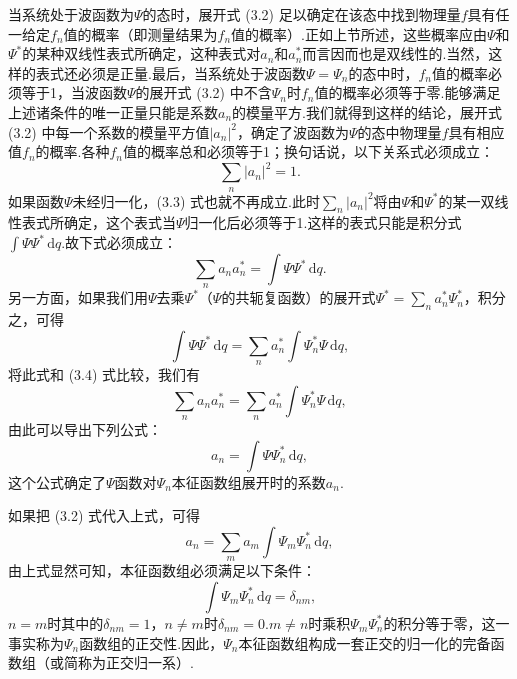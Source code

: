 当系统处于波函数为$\varPsi$的态时，展开式 (3.2) 足以确定在该态中找到物理量$f$具有任一给定$f_n$值的概率（即测量结果为$f_n$值的概率）.正如上节所述，这些概率应由$\varPsi$和$\varPsi^{*}$的某种双线性表式所确定，这种表式对$a_n$和$a_n^{*}$而言因而也是双线性的.当然，这样的表式还必须是正量.最后，当系统处于波函数$\varPsi=\varPsi_n$的态中时，$f_n$值的概率必须等于1，当波函数$\varPsi$的展开式 (3.2) 中不含$\varPsi_n$时$f_n$值的概率必须等于零.能够满足上述诸条件的唯一正量只能是系数$a_n$的模量平方.我们就得到这样的结论，展开式 (3.2) 中每一个系数的模量平方值$|a_n|^2$，确定了波函数为$\varPsi$的态中物理量$f$具有相应值$f_n$的概率.各种$f_n$值的概率总和必须等于1；换句话说，以下关系式必须成立：
\begin{equation}
  \sum_n|a_n|^2=1.
\end{equation}
如果函数$\varPsi$未经归一化，(3.3) 式也就不再成立.此时$\sum_n|a_n|^2$将由$\varPsi$和$\varPsi^{*}$的某一双线性表式所确定，这个表式当$\varPsi$归一化后必须等于1.这样的表式只能是积分式$\int\varPsi\varPsi^{*}\,\mathrm{d}q$.故下式必须成立：
\begin{equation}
  \sum_n a_na_n^{*}=\int\varPsi\varPsi^{*}\,\mathrm{d}q.
\end{equation}
另一方面，如果我们用$\varPsi$去乘$\varPsi^{*}$（$\varPsi$的共轭复函数）的展开式$\varPsi^{*}=\sum_n a_n^{*}\varPsi_n^{*}$，积分之，可得
\begin{equation*}
  \int\varPsi\varPsi^{*}\,\mathrm{d}q=\sum_n a_n^{*}\int\varPsi_n^{*}\varPsi\,\mathrm{d}q,
\end{equation*}
将此式和 (3.4) 式比较，我们有
\begin{equation*}
  \sum_n a_na_n^{*}=\sum_n a_n^{*}\int\varPsi_n^{*}\varPsi\,\mathrm{d}q,
\end{equation*}
由此可以导出下列公式：
\begin{equation}
  a_n=\int\varPsi\varPsi_n^{*}\,\mathrm{d}q,
\end{equation}
这个公式确定了$\varPsi$函数对$\varPsi_n$本征函数组展开时的系数$a_n$.

如果把 (3.2) 式代入上式，可得
\begin{equation*}
  a_n=\sum_m a_m\int\varPsi_m\varPsi_n^{*}\,\mathrm{d}q,
\end{equation*}
由上式显然可知，本征函数组必须满足以下条件：
\begin{equation}
  \int\varPsi_m\varPsi_n^{*}\,\mathrm{d}q=\delta_{nm},
\end{equation}
$n=m$时其中的$\delta_{nm}=1$，$n\neq m$时$\delta_{nm}=0$.$m\neq n$时乘积$\varPsi_m\varPsi_n^{*}$的积分等于零，这一事实称为$\varPsi_n$函数组的正交性.因此，$\varPsi_n$本征函数组构成一套正交的归一化的完备函数组（或简称为正交归一系）.

